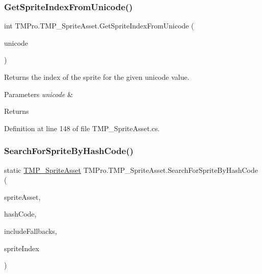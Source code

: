 \subsubsection{\texorpdfstring{GetSpriteIndexFromUnicode()}{GetSpriteIndexFromUnicode()}}
{\footnotesize\ttfamily int T\+M\+Pro.\+T\+M\+P\+\_\+\+Sprite\+Asset.\+Get\+Sprite\+Index\+From\+Unicode (\begin{DoxyParamCaption}\item[{int}]{unicode }\end{DoxyParamCaption})}



Returns the index of the sprite for the given unicode value. 


\begin{DoxyParams}{Parameters}
{\em unicode} & \\
\hline
\end{DoxyParams}
\begin{DoxyReturn}{Returns}

\end{DoxyReturn}


Definition at line 148 of file T\+M\+P\+\_\+\+Sprite\+Asset.\+cs.

\mbox{\label{class_t_m_pro_1_1_t_m_p___sprite_asset_a0a140b6024a1c437a950681c7c9f4212}} 
\subsubsection{\texorpdfstring{SearchForSpriteByHashCode()}{SearchForSpriteByHashCode()}}
{\footnotesize\ttfamily static \mbox{\hyperlink{class_t_m_pro_1_1_t_m_p___sprite_asset}{T\+M\+P\+\_\+\+Sprite\+Asset}} T\+M\+Pro.\+T\+M\+P\+\_\+\+Sprite\+Asset.\+Search\+For\+Sprite\+By\+Hash\+Code (\begin{DoxyParamCaption}\item[{\mbox{\hyperlink{class_t_m_pro_1_1_t_m_p___sprite_asset}{T\+M\+P\+\_\+\+Sprite\+Asset}}}]{sprite\+Asset,  }\item[{int}]{hash\+Code,  }\item[{bool}]{include\+Fallbacks,  }\item[{out int}]{sprite\+Index }\end{DoxyParamCaption})\hspace{0.3cm}{\ttfamily [static]}}



